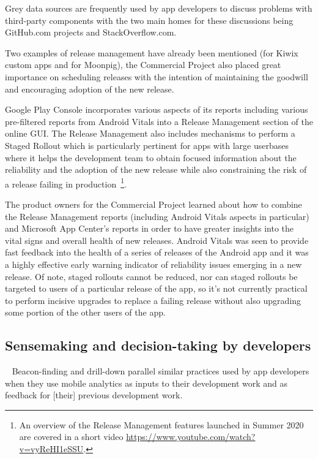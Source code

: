 Grey data sources are frequently used by app developers to discuss problems with third-party components with the two main homes for these discussions being GitHub.com projects and StackOverflow.com.


Two examples of release management have already been mentioned (for Kiwix custom apps and for Moonpig), the Commercial Project also placed great importance on scheduling releases with the intention of maintaining the goodwill and encouraging adoption of the new release. 

Google Play Console incorporates various aspects of its reports including various pre-filtered reports from Android Vitals into a Release Management section of the online GUI. The Release Management also includes mechanisms to perform a Staged Rollout which is particularly pertinent for apps with large userbases where it helps the development team to obtain focused information about the reliability and the adoption of the new release while also constraining the risk of a release failing in production~\footnote{An overview of the Release Management features launched in Summer 2020 are covered in a short video \url{https://www.youtube.com/watch?v=vyReHI1eSSU}.}. 

The product owners for the Commercial Project learned about how to combine the Release Management reports (including Android Vitals aspects in particular) and Microsoft App Center's reports in order to have greater insights into the vital signs and overall health of new releases. Android Vitals was seen to provide fast feedback into the health of a series of releases of the Android app and it was a highly effective early warning indicator of reliability issues emerging in a new release. Of note, staged rollouts cannot be reduced, nor can staged rollouts be targeted to users of a particular release of the app, so it's not currently practical to perform incisive upgrades to replace a failing release without also upgrading some portion of the other users of the app.

\subsection{Sensemaking and decision-taking by developers}~\label{aiu-sensemaking-and-decision-taking-by-developers-section}
Beacon-finding and drill-down parallel similar practices used by app developers when they use mobile analytics as inputs to their development work and as feedback for [their] previous development work.

